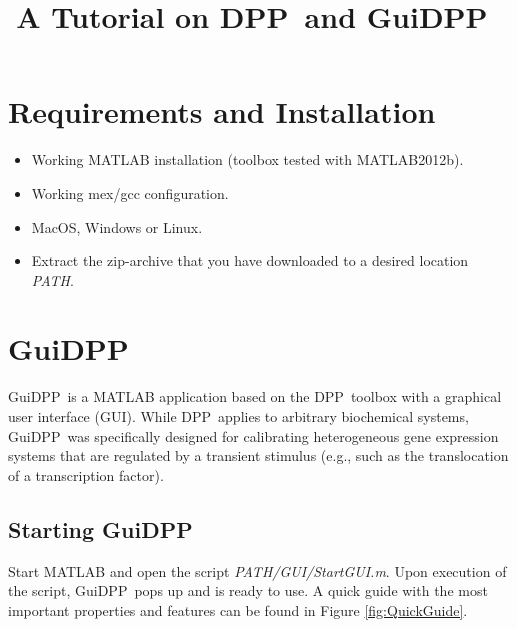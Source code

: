 \documentclass[a4paper, 9pt]{scrartcl}
\begin{document}


\def\DPP{DPP~}
\def\GuiDPP{GuiDPP~}

\title{A Tutorial on \DPP and \GuiDPP}
\date{}
\maketitle



\tableofcontents

\newpage

\section{Requirements and Installation}

\begin{itemize}
	\item Working MATLAB installation (toolbox tested with MATLAB2012b).
	\item Working mex/gcc configuration.
	\item MacOS, Windows or Linux.
	\item Extract the zip-archive that you have downloaded to a desired location \textit{PATH}. 
\end{itemize}

\section{\GuiDPP}

\GuiDPP is a MATLAB application based on the \DPP toolbox with a graphical user interface (GUI). While \DPP applies to arbitrary biochemical systems, \GuiDPP was specifically designed for calibrating heterogeneous gene expression systems that are regulated by a transient stimulus (e.g., such as the translocation of a transcription factor).

\subsection{Starting \GuiDPP}

Start MATLAB and open the script \textit{PATH/GUI/StartGUI.m}. Upon execution of the script, \GuiDPP  pops up and is ready to use. A quick guide with the most important properties and features can be found in Figure \ref{fig:QuickGuide}.
\end{document}
